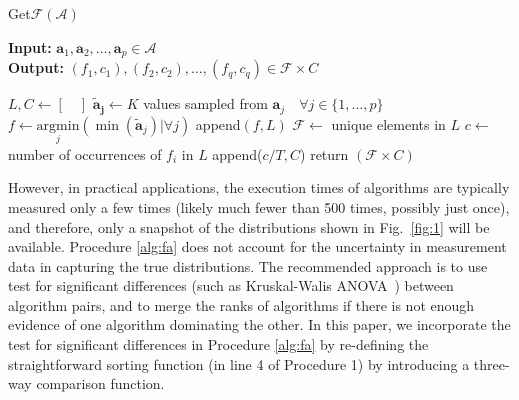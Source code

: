 \documentclass[conference]{IEEEtran}
\newcommand{\p}[1]{{\color{blue} Pdj: #1}}
\begin{document}
\begin{algorithm}
	\caption{ Get$\mathcal{F}$$(\mathcal{A})$ }
	\label{alg:fa}
	\hspace*{\algorithmicindent} \textbf{Input: } $ \mathbf{a}_1,\mathbf{a}_2 ,\dots, \mathbf{a}_p\in \mathcal{A}$ \\
	\hspace*{\algorithmicindent} \textbf{Output: } $ (f_1,c_1), (f_2, c_2), \dots, (f_q,c_q) \in \mathcal{F} \times C  $
	\begin{algorithmic}[1] 
		\State $L, C \leftarrow [ \quad ]$ 
		\State $\mathbf{\tilde{a}_j} \leftarrow K $ values sampled from $\mathbf{a}_j \quad \forall j \in \{1,\dots,p\}$ 
		\State $ f \leftarrow \underset{j}{\mathrm{argmin}}(\min(\mathbf{\tilde{a}}_j) | \forall j)$ 
                \State append$(f,L)$
		\EndFor
		\State $\mathcal{F} \leftarrow $ unique elements in $L$ 
        \State $c \leftarrow$ number of occurrences of $f_i$ in $L$ 
		\State append($c/T, C$)
		\EndFor
		\State return $(\mathcal{F} \times C)$
              \end{algorithmic}
\end{algorithm}

However, in practical applications, the execution times of algorithms are typically
measured only a few times (likely much fewer than 500 times, possibly just once), and therefore, only a snapshot of the distributions
shown in Fig.~\ref{fig:1} will be available. Procedure \ref{alg:fa} does not account for the uncertainty in measurement data in capturing the true distributions. 
The recommended approach is to use test for significant differences (such as Kruskal-Walis
ANOVA~\cite{hoefler2015scientific}) between algorithm pairs, and to merge the ranks of algorithms if there is not enough
evidence of one algorithm dominating the other. In this paper, we incorporate the test for significant differences in
Procedure \ref{alg:fa} by re-defining the straightforward sorting function (in line 4 of Procedure 1) by introducing a
three-way comparison function. 
\end{document}
